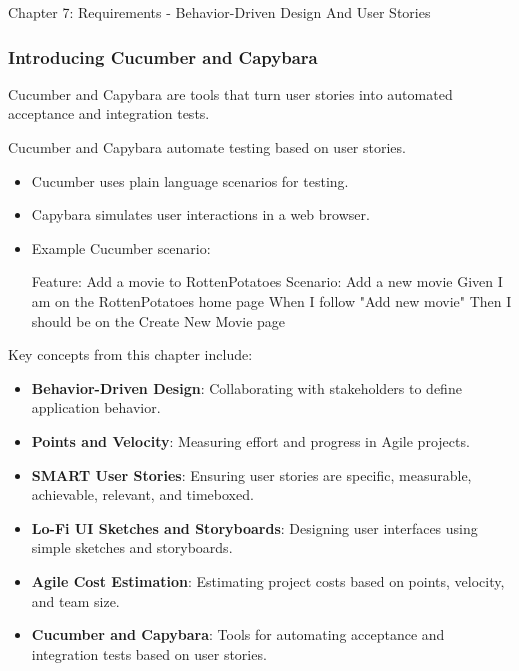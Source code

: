 \begin{notes}{Chapter 7: Requirements - Behavior-Driven Design And User Stories}
\begin{highlight}
    \end{highlight}
    
    \subsubsection*{Introducing Cucumber and Capybara}
    
    Cucumber and Capybara are tools that turn user stories into automated acceptance and integration tests.
    
    \begin{highlight}
    
        Cucumber and Capybara automate testing based on user stories.
        
        \begin{itemize}
            \item Cucumber uses plain language scenarios for testing.
            \item Capybara simulates user interactions in a web browser.
            \item Example Cucumber scenario:
    \begin{code}[Bash]
    Feature: Add a movie to RottenPotatoes
    Scenario: Add a new movie
    Given I am on the RottenPotatoes home page
    When I follow "Add new movie"
    Then I should be on the Create New Movie page
    \end{code}
        \end{itemize}
    
    \end{highlight}
    
    \begin{highlight}
    
        Key concepts from this chapter include:
        
        \begin{itemize}
            \item \textbf{Behavior-Driven Design}: Collaborating with stakeholders to define application behavior.
            \item \textbf{Points and Velocity}: Measuring effort and progress in Agile projects.
            \item \textbf{SMART User Stories}: Ensuring user stories are specific, measurable, achievable, relevant, and timeboxed.
            \item \textbf{Lo-Fi UI Sketches and Storyboards}: Designing user interfaces using simple sketches and storyboards.
            \item \textbf{Agile Cost Estimation}: Estimating project costs based on points, velocity, and team size.
            \item \textbf{Cucumber and Capybara}: Tools for automating acceptance and integration tests based on user stories.
        \end{itemize}
        
    \end{highlight}
\end{notes}

